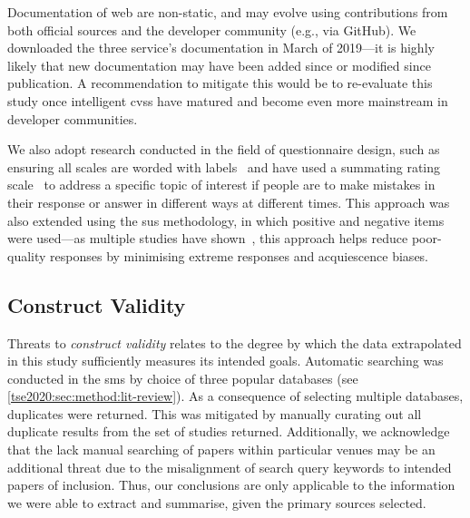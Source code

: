 Documentation of web  are non-static, and may evolve using contributions from both official sources and the developer community (e.g., via GitHub). We downloaded the three service's  documentation in March of 2019---it is highly likely that new documentation may have been added since or modified since publication. A recommendation to mitigate this would be to re-evaluate this study once intelligent \glspl{cvs} have matured and become even more mainstream in developer communities.


We also adopt research conducted in the field of questionnaire design, such as ensuring all scales are worded with labels~\citep{Krosnick:1999wt} and have used a summating rating scale~\citep{Spector:1992uj} to address a specific topic of interest if people are to make mistakes in their response or answer in different ways at different times. This approach was also extended using the \gls{sus} methodology, in which positive and negative items were used---as multiple studies have shown~\citep{Sauro:2011aj,Brooke:2013vt}, this approach helps reduce poor-quality responses by minimising extreme responses and acquiescence biases. 

\subsection{Construct Validity}

Threats to \textit{construct validity} relates to the degree by which the data extrapolated in this study sufficiently measures its intended goals. Automatic searching was conducted in the \gls{sms} by choice of three popular databases (see \cref{tse2020:sec:method:lit-review}). As a consequence of selecting multiple databases, duplicates were returned. This was mitigated by manually curating out all duplicate results from the set of studies returned. Additionally, we acknowledge that the lack manual searching of papers within particular venues may be an additional threat due to the misalignment of search query keywords to intended papers of inclusion. Thus, our conclusions are only applicable to the information we were able to extract and summarise, given the primary sources selected.

